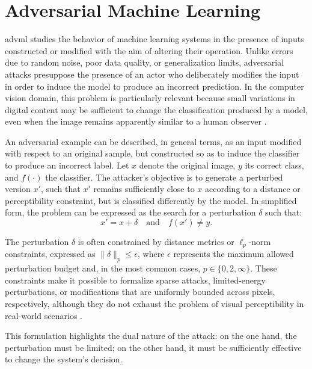 \section{Adversarial Machine Learning}
\label{sec:background_adversarial_ml}
\gls{advml} studies the behavior of machine learning systems in the presence of
inputs constructed or modified with the aim of altering their operation. Unlike
errors due to random noise, poor data quality, or generalization limits,
adversarial attacks presuppose the presence of an actor who deliberately
modifies the input in order to induce the model to produce an incorrect
prediction. In the computer vision domain, this problem is particularly
relevant because small variations in digital content may be sufficient to
change the classification produced by a model, even when the image remains
apparently similar to a human observer
\cite{szegedy2014intriguing,goodfellow2015explaining}.

An adversarial example can be described, in general terms, as an input modified
with respect to an original sample, but constructed so as to induce the
classifier to produce an incorrect label. Let \(x\) denote the original image,
\(y\) its correct class, and \(f(\cdot)\) the classifier. The attacker's
objective is to generate a perturbed version \(x'\), such that \(x'\) remains
sufficiently close to \(x\) according to a distance or perceptibility
constraint, but is classified differently by the model. In simplified form, the
problem can be expressed as the search for a perturbation \(\delta\) such that:
\[
x' = x + \delta
\quad \text{and} \quad
f(x') \neq y.
\]

The perturbation \(\delta\) is often constrained by distance metrics or
\(\ell_p\)-norm constraints, expressed as \(\|\delta\|_p \leq \epsilon\), where
\(\epsilon\) represents the maximum allowed perturbation budget and, in the most
common cases, \(p \in \{0,2,\infty\}\). These constraints make it possible to
formalize sparse attacks, limited-energy perturbations, or modifications that
are uniformly bounded across pixels, respectively, although they do not exhaust
the problem of visual perceptibility in real-world scenarios
\cite{carlini2017towards,akhtar2018threat}.

This formulation highlights the dual nature of the attack: on the one hand, the
perturbation must be limited; on the other hand, it must be sufficiently
effective to change the system's decision.

